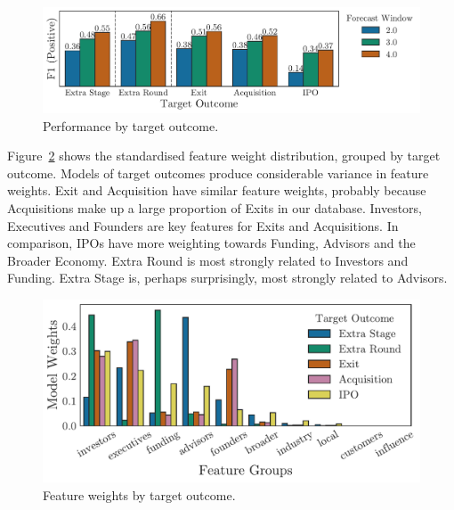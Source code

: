 \documentclass[../thesis/thesis.tex]{subfiles}
\begin{document}
\begin{figure}[!htb]
    \centering
    \includegraphics[width=\textwidth]{../figures/evaluation/performance_outcome}
    \caption[Performance by target outcome]{Performance by target outcome.}
    \label{fig:evaluation:f1_predictive_outcome}
\end{figure}

Figure~\ref{fig:evaluation:features_outcome} shows the standardised feature weight distribution, grouped by target outcome. Models of target outcomes produce considerable variance in feature weights. Exit and Acquisition have similar feature weights, probably because Acquisitions make up a large proportion of Exits in our database. Investors, Executives and Founders are key features for Exits and Acquisitions. In comparison, IPOs have more weighting towards Funding, Advisors and the Broader Economy. Extra Round is most strongly related to Investors and Funding. Extra Stage is, perhaps surprisingly, most strongly related to Advisors.

\begin{figure}[!htb]
    \centering
    \includegraphics[width=\textwidth]{../figures/evaluation/features_outcome}
    \caption[Feature weights by target outcome]{Feature weights by target outcome.}
    \label{fig:evaluation:features_outcome}
\end{figure}

\end{document}
